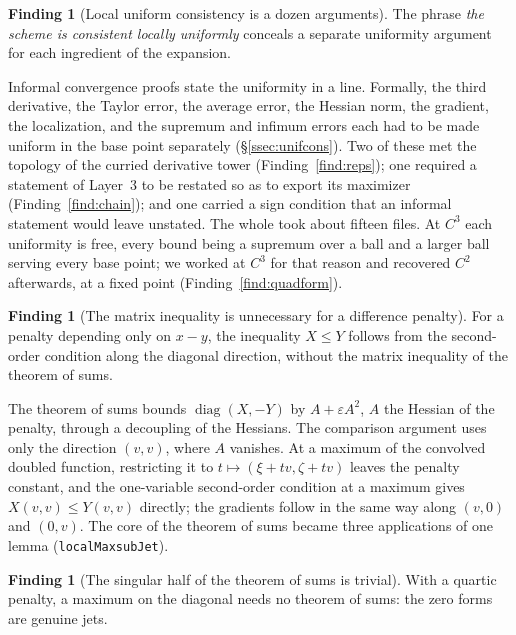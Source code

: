 \documentclass[11pt,reqno]{amsart}
\newcommand{\LEANREF}[1]{\texttt{\small\def\_{\textunderscore\allowbreak}#1}}
\theoremstyle{plain}
\theoremstyle{definition}
\newtheorem{finding}[theorem]{Finding}
\begin{document}
\begin{finding}[Local uniform consistency is a dozen arguments]\label{find:locunif}
The phrase \emph{the scheme is consistent locally uniformly} conceals a separate
uniformity argument for each ingredient of the expansion.
\end{finding}

Informal convergence proofs state the uniformity in a line. Formally, the third
derivative, the Taylor error, the average error, the Hessian norm, the
gradient, the localization, and the supremum and infimum errors each had to be
made uniform in the base point separately (\S\ref{ssec:unifcons}). Two of these
met the topology of the curried derivative tower (Finding~\ref{find:reps}); one
required a statement of Layer~3 to be restated so as to export its maximizer
(Finding~\ref{find:chain}); and one carried a sign condition that an informal
statement would leave unstated. The whole took about fifteen files. At $C^3$
each uniformity is free, every bound being a supremum over a ball and a larger
ball serving every base point; we worked at $C^3$ for that reason and recovered
$C^2$ afterwards, at a fixed point (Finding~\ref{find:quadform}).

\begin{finding}[The matrix inequality is unnecessary for a difference
penalty]\label{find:diagonal}
For a penalty depending only on $x - y$, the inequality $X \le Y$ follows from
the second-order condition along the diagonal direction, without the matrix
inequality of the theorem of sums.
\end{finding}

The theorem of sums bounds $\operatorname{diag}(X, -Y)$ by $A + \varepsilon A^2$,
$A$ the Hessian of the penalty, through a decoupling of the Hessians. The
comparison argument uses only the direction $(v, v)$, where $A$ vanishes. At a
maximum of the convolved doubled function, restricting it to
$t \mapsto (\xi + tv, \zeta + tv)$ leaves the penalty constant, and the
one-variable second-order condition at a maximum gives $X(v,v) \le Y(v,v)$
directly; the gradients follow in the same way along $(v, 0)$ and $(0, v)$. The
core of the theorem of sums became three applications of one lemma
(\LEANREF{localMax\_subJet}).

\begin{finding}[The singular half of the theorem of sums is
trivial]\label{find:singsums}
With a quartic penalty, a maximum on the diagonal needs no theorem of sums: the
zero forms are genuine jets.
\end{finding}
\end{document}
